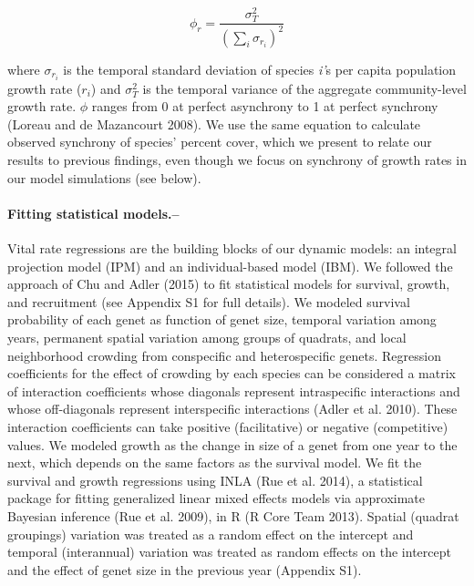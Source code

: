 \documentclass[12pt,]{article}
\begin{document}
\begin{equation}
\phi_r = \frac{\sigma^{2}_{T}}{(\sum_{i}\sigma_{r_{i}})^{2}}
\end{equation}

\noindent where \(\sigma_{r_{i}}\) is the temporal
standard deviation of species \emph{i'}s per capita
population growth rate (\(r_i\)) and \(\sigma^{2}_{T}\) is the temporal
variance of the aggregate community-level growth rate. \(\phi\) ranges
from 0 at perfect asynchrony to 1 at perfect synchrony (Loreau and {{de
Mazancourt}} 2008). We use the same equation to calculate observed
synchrony of species' percent cover, which we present to relate our
results to previous findings, even though we focus on synchrony of
growth rates in our model simulations (see below).

\paragraph{Fitting statistical
models.--}\label{fitting-statistical-models.}

Vital rate regressions are the building blocks of our dynamic models: an
integral projection model (IPM) and an individual-based model (IBM). We
followed the approach of Chu and Adler (2015) to fit statistical models
for survival, growth, and recruitment (see Appendix S1 for full
details). We modeled survival probability of each genet as function of
genet size, temporal variation among years, permanent spatial variation
among groups of quadrats, and local neighborhood crowding from
conspecific and heterospecific genets. Regression coefficients for the
effect of crowding by each species can be considered a matrix of
interaction coefficients whose diagonals represent intraspecific
interactions and whose off-diagonals represent interspecific
interactions (Adler et al. 2010). These interaction coefficients can
take positive (facilitative) or negative (competitive) values. We
modeled growth as the change in size of a genet from one year to the
next, which depends on the same factors as the survival model. We fit
the survival and growth regressions using INLA (Rue et al. 2014), a
statistical package for fitting generalized linear mixed effects models
via approximate Bayesian inference (Rue et al. 2009), in R (R Core Team
2013). Spatial (quadrat groupings) variation was treated as a random
effect on the intercept and temporal (interannual) variation was treated
as random effects on the intercept and the effect of genet size in the
previous year (Appendix S1).
\end{document}

